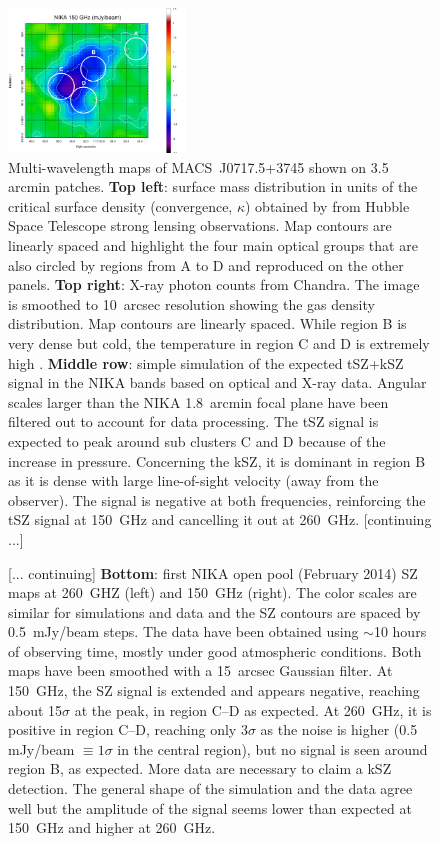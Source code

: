 \documentclass[11pt,a4paper,twoside,graphicx,color]{article}
\begin{document}
\begin{figure}[h!]
	\includegraphics[width=0.42\textwidth]{NIKA2mm.pdf}
	\caption{Multi-wavelength maps of \mbox{MACS~J0717.5+3745} shown on 3.5 arcmin patches. {\bf Top left}: surface mass distribution in units of the critical surface density (convergence, $\kappa$) obtained by \cite{zitrin2009} from Hubble Space Telescope strong lensing observations. Map contours are linearly spaced and highlight the four main optical groups that are also circled by regions from A to D and reproduced on the other panels. {\bf Top right}: \mbox{X-ray} photon counts from Chandra. The image is smoothed to 10~arcsec resolution showing the gas density distribution. Map contours are linearly spaced. While region B is very dense but cold, the temperature in region C and D is extremely high \citep[$\sim$ 30~keV,][]{ma2009}. {\bf Middle row}: simple simulation of the expected tSZ+kSZ signal in the NIKA bands based on optical and \mbox{X-ray} data. Angular scales larger than the NIKA 1.8~arcmin focal plane have been filtered out to account for data processing. The tSZ signal is expected to peak around sub clusters C and D because of the increase in pressure. Concerning the kSZ, it is dominant in region B as it is dense with large line-of-sight velocity (away from the observer). The signal is negative at both frequencies, reinforcing the tSZ signal at 150~GHz and cancelling it out at 260~GHz. \textcolor{gris}{[continuing ...]}}
	\label{fig:maps} 
\end{figure}
\addtocounter{figure}{-1}
\begin{figure} [h!]
  \caption{\textcolor{gris}{[... continuing]} {\bf Bottom}: first NIKA open pool (February 2014) SZ maps at 260~GHZ (left) and 150~GHz (right). The color scales are similar for simulations and data and the SZ contours are spaced by 0.5~mJy/beam steps. The data have been obtained using $\sim$10 hours of observing time, mostly under good atmospheric conditions. Both maps have been smoothed with a 15~arcsec Gaussian filter. At 150~GHz, the SZ signal is extended and appears negative, reaching about 15$\sigma$ at the peak, in region C--D as expected. At 260~GHz, it is positive in region C--D, reaching only 3$\sigma$ as the noise is higher (0.5 mJy/beam $\equiv 1\sigma$ in the central region), but no signal is seen around region B, as expected. More data are necessary to claim a kSZ detection. The general shape of the simulation and the data agree well but the amplitude of the signal seems lower than expected at 150~GHz and higher at 260~GHz.}
\end{figure}
\end{document}
